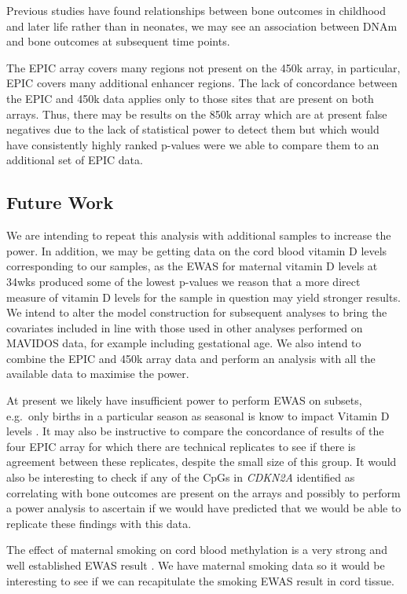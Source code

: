 \documentclass[]{book}
\begin{document}
Previous studies have found relationships between bone outcomes in childhood and later life rather than in neonates, we may see an association between DNAm and bone outcomes at subsequent time points.

The EPIC array covers many regions not present on the 450k array, in particular, EPIC covers many additional enhancer regions. The lack of concordance between the EPIC and 450k data applies only to those sites that are present on both arrays. Thus, there may be results on the 850k array which are at present false negatives due to the lack of statistical power to detect them but which would have consistently highly ranked p-values were we able to compare them to an additional set of EPIC data.

\hypertarget{future-work}{%
\subsection{Future Work}\label{future-work}}

We are intending to repeat this analysis with additional samples to increase the power. In addition, we may be getting data on the cord blood vitamin D levels corresponding to our samples, as the EWAS for maternal vitamin D levels at 34wks produced some of the lowest p-values we reason that a more direct measure of vitamin D levels for the sample in question may yield stronger results. We intend to alter the model construction for subsequent analyses to bring the covariates included in line with those used in other analyses performed on MAVIDOS data, for example including gestational age. We also intend to combine the EPIC and 450k array data and perform an analysis with all the available data to maximise the power.

At present we likely have insufficient power to perform EWAS on subsets, e.g.~only births in a particular season as seasonal is know to impact Vitamin D levels \citep{Sachs2013}. It may also be instructive to compare the concordance of results of the four EPIC array for which there are technical replicates to see if there is agreement between these replicates, despite the small size of this group. It would also be interesting to check if any of the CpGs in \emph{CDKN2A} identified as correlating with bone outcomes are present on the arrays and possibly to perform a power analysis to ascertain if we would have predicted that we would be able to replicate these findings with this data.

The effect of maternal smoking on cord blood methylation is a very strong and well established EWAS result \citep[\citet{Breton2017}]{Joubert2016}. We have maternal smoking data so it would be interesting to see if we can recapitulate the smoking EWAS result in cord tissue.
\end{document}
